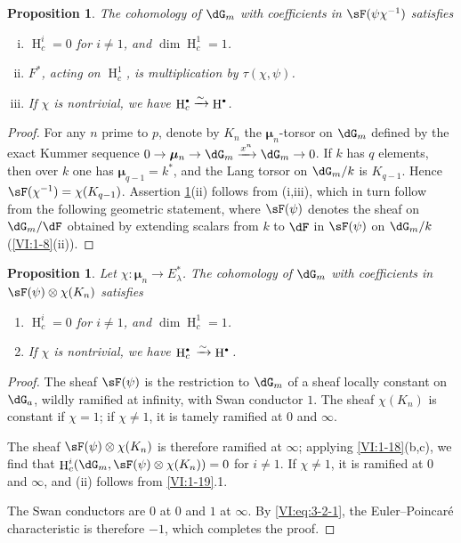 \documentclass[oneside]{book}
\DeclareMathOperator{\h}{H}
\newcommand{\dmu}{{\bm\mu}}
\newcounter{char}
\newcommand{\iso}{\xrightarrow\sim}
\theoremstyle{sga-source}
\theoremstyle{sga-source-dash}
\theoremstyle{sga-source-dotdash}
\theoremstyle{sga-source-number-note-dash}
\theoremstyle{sga-source-note-number-dotdash}
\theoremstyle{sga-source-example-dotdash}
\theoremstyle{sga-source-inline-number}
\theoremstyle{sga-source-bare-number}
\theoremstyle{sga-source}
\newtheorem{proposition_}[subsection]{Proposition}
\let\oldbullet\bullet
\renewcommand{\bullet}{\textnormal{\tiny$\oldbullet$}}
\newcommand{\PrintPage}[1]{}\newcommand{\MathPage}[1]{}\newcommand{\PrintCite}[2]{#1}\newcommand{\var}[3]{#1}
\begin{document}
\begin{proposition_}\label{VI:4-2}
The cohomology of $\dG_m$ with coefficients in $\sF(\psi\chi^{-1})$ satisfies 
\begin{enumerate}[(i)]
  \item $\h_c^i=0$ for $i\ne 1$, and $\dim \h_c^1=1$. 
  \item $F^\ast$, acting on $\h_c^1$, is multiplication by 
    $\tau(\chi,\psi)$. 
  \item If $\chi$ is nontrivial, we have $\h_c^\bullet \iso \h^\bullet$. 
\end{enumerate}
\end{proposition_}
\begin{proof}[Proof]
For any $n$ prime to $p$, denote by $K_n$ the $\dmu_n$-torsor on $\dG_m$ 
defined by the exact Kummer sequence 
$0 \to \dmu_n \to \dG_m \xrightarrow{x^n} \dG_m \to 0$. If $k$ has $q$ 
elements, then over $k$ one has $\dmu_{q-1}=k^\ast$, and the Lang torsor on 
$\dG_m/k$ is $K_{q-1}$. Hence $\sF(\chi^{-1})=\chi(K_{q-1})$. 
Assertion \ref{VI:4-2}(ii) follows from (i,iii), which in turn follow from 
the following geometric statement, where $\sF(\psi)$ denotes the sheaf 
on $\dG_m/\dF$ obtained by extending scalars from $k$ to $\dF$ in 
$\sF(\psi)$ on $\dG_m/k$ (\ref{VI:1-8}(ii)). 
\end{proof}





\begin{proposition_}\label{VI:4-3}
Let $\chi:\dmu_n \to E_\lambda^\ast$. The cohomology of $\dG_m$ with 
coefficients in $\sF(\psi)\otimes \chi(K_n)$ satisfies 
\begin{enumerate}[\indent (i)]
  \item $\h_c^i=0$ for $i\ne 1$, and $\dim \h_c^1{} = 1$. 
  \item If $\chi$ is nontrivial, we have $\h_c^\bullet{}\iso \h^\bullet{}$. 
\end{enumerate}
\end{proposition_}
\PrintPage{197}
\begin{proof}[Proof]
The sheaf $\sF(\psi)$ is the restriction to $\dG_m$ of a sheaf locally 
constant on $\dG_a$, wildly ramified at infinity, with Swan conductor 
$1$. The sheaf $\chi(K_n)$ is constant if $\chi=1$; if $\chi\ne 1$, it 
is tamely ramified at $0$ and $\infty$. 

The sheaf $\sF(\psi)\otimes\chi(K_n)$ is therefore ramified at $\infty$; 
applying \ref{VI:1-18}(b,c), we find that 
$\h_c^i(\dG_m,\sF(\psi)\otimes \chi(K_n))=0$ for $i\ne 1$. If $\chi\ne 1$, it 
is ramified at $0$ and $\infty$, and (ii) follows from \ref{VI:1-19}.1. 

The Swan conductors are $0$ at $0$ and $1$ at $\infty$. By 
\eqref{VI:eq:3-2-1}, the Euler--Poincaré characteristic is therefore $-1$, 
which completes the proof. 
\end{proof}
\end{document}
